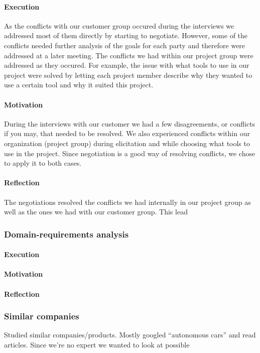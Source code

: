 \documentclass[10pt]{article}
\begin{document}
\paragraph{Execution}
As the conflicts with our customer group occured during the interviews we addressed most of them directly by starting to negotiate. However, some of the conflicts needed further analysis of the goals for each party and therefore were addressed at a later meeting. The conflicts we had within our project group were addressed as they occured. For example, the issue with what tools to use in our project were solved by letting each project member describe why they wanted to use a certain tool and why it suited this project. 
\paragraph{Motivation}
During the interviews with our customer we had a few disagreements, or conflicts if you may, that needed to be resolved. We also experienced conflicts within our organization (project group) during elicitation and while choosing what tools to use in the project. Since negotiation is a good way of resolving conflicts, we chose to apply it to both cases.
\paragraph{Reflection}
The negotiations resolved the conflicts we had internally in our project group as well as the ones we had with our customer group. This lead 


\subsubsection{Domain-requirements analysis}
\paragraph{Execution}
\paragraph{Motivation}
\paragraph{Reflection}


\subsubsection{Similar companies}
Studied similar companies/products. Mostly googled “autonomous cars” and read articles. 
Since we’re no expert we wanted to look at possible
\end{document}
